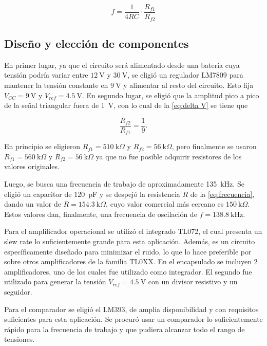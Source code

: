 \begin{equation}
    f = \frac{1}{4RC} \cdot \frac{R_{f1}}{R_{f2}}
    \label{eq:frecuencia}
\end{equation}

\subsection{Diseño y elección de componentes}

En primer lugar, ya que el circuito será alimentado desde una batería cuya tensión podría variar entre $\SI{12}{\volt}$ y $\SI{30}{\volt}$, se eligió un regulador LM7809 para mantener la tensión constante en $\SI{9}{\volt}$ y alimentar al resto del circuito. Esto fija $V_{CC} = \SI{9}{\volt}$ y $V_{ref} = \SI{4,5}{\volt}$. En segundo lugar, se eligió que la amplitud pico a pico de la señal triangular fuera de \SI{1}{\volt}, con lo cual de la \autoref{eq:delta V} se tiene que

\begin{equation*}
    \frac{R_{f2}}{R_{f1}} = \frac{1}{9}.
\end{equation*}

En principio se eligieron $R_{f1} = \SI{510}{\kilo \Omega}$ y $R_{f2} = \SI{56}{\kilo \Omega}$, pero finalmente se usaron $R_{f1} = \SI{560}{\kilo \Omega}$ y $R_{f2} = \SI{56}{\kilo \Omega}$ ya que no fue posible adquirir resistores de los valores originales. 

Luego, se busca una frecuencia de trabajo de aproximadamente \SI{135}{\kilo \hertz}. Se eligió un capacitor de \SI{120}{\pico \farad} y se despejó la resistencia $R$ de la \autoref{eq:frecuencia}, dando un valor de $R = \SI{154,3}{\kilo \Omega}$, cuyo valor comercial más cercano es $\SI{150}{\kilo \Omega}$. Estos valores dan, finalmente, una frecuencia de oscilación de $f = \SI{138,8}{\kilo \hertz}$.

Para el amplificador operacional se utilizó el integrado TL072, el cual presenta un slew rate lo suficientemente grande para esta aplicación. Además, es un circuito específicamente diseñado para minimizar el ruido, lo que lo hace preferible por sobre otros amplificadores de la familia TL0XX. En el encapsulado se incluyen 2 amplificadores, uno de los cuales fue utilizado como integrador. El segundo fue utilizado para generar la tensión $V_{ref} = \SI{4,5}{\volt}$ con un divisor resistivo y un seguidor. 

Para el comparador se eligió el LM393, de amplia disponibilidad y con requisitos suficientes para esta aplicación. Se procuró usar un comparador lo suficientemente rápido para la frecuencia de trabajo y que pudiera alcanzar todo el rango de tensiones. 

